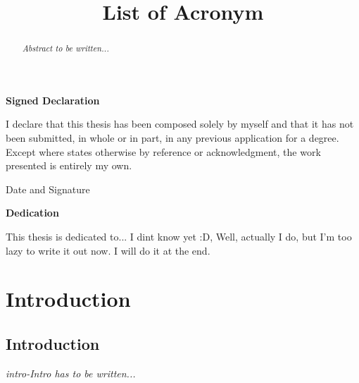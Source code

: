 \documentclass[letterpaper, openright]{report}
\begin{document}
    \begin{abstract}
\textit{Abstract to be written...}
	\end{abstract}

\begin{center}

  \huge \textbf{Signed Declaration}
  
\end{center} 
\vspace{0.3cm}
I declare that this thesis has been composed solely by myself and that it has not been submitted, in whole or in part, in any previous application for a degree. Except where states otherwise by reference or acknowledgment, the work presented is entirely my own.

\vspace{12cm}

\begin{flushright}

  \large Date and Signature
  
\end{flushright}

\newpage

\begin{center}

  \huge \textbf{Dedication}
  
\end{center} 
\vspace{0.3cm}
This thesis is dedicated to... I dint know yet :D, Well, actually I do, but I'm too lazy to write it out now. I will do it at the end.
 

	\newpage   
	\thispagestyle{empty}
	
   	\listoffigures
	\listoftables
    \newpage
	
    \title{\textbf{List of Acronym}}   
    
 	\newpage   
    \newpage
	\tableofcontents
	\newpage



\chapter{Introduction} %
\label{sec:introduction}

	\section{Introduction} %
	\label{sub:intro-intro}
\textit{intro-Intro has to be written...}	
    
\end{document}

